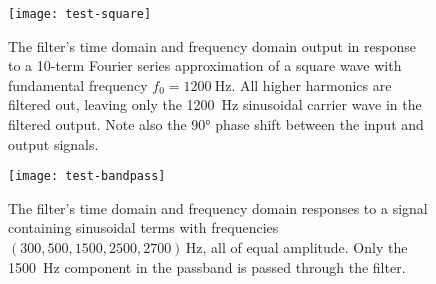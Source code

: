\begin{figure}[htb!]
	\centering
	\texttt{[image: test-square]}
    \vspace{-5ex}
	\caption{The filter's time domain and frequency domain output in response to a 10-term Fourier series approximation of a square wave with fundamental frequency $ f_{0} = \SI{1200}{\hertz} $. All higher harmonics are filtered out, leaving only the \SI{1200}{\hertz} sinusoidal carrier wave in the filtered output. Note also the $ \ang{90} $ phase shift between the input and output signals.}
	\label{fig:square}
\end{figure}

\begin{figure}[htb!]
	\centering
	\texttt{[image: test-bandpass]}
    \vspace{-5ex}
	\caption{The filter's time domain and frequency domain responses to a signal containing sinusoidal terms with frequencies $ (300, 500, 1500, 2500, 2700) \, \si{\hertz} $, all of equal amplitude. Only the \SI{1500}{\hertz} component in the passband is passed through the filter.}
	\label{fig:bandpass}
\end{figure}

\newpage
\printbibliography


